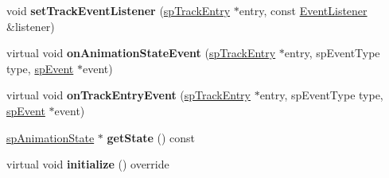 \begin{DoxyCompactItemize}
void {\bfseries set\+Track\+Event\+Listener} (\hyperlink{structspTrackEntry}{sp\+Track\+Entry} $\ast$entry, const \hyperlink{classEventListener}{Event\+Listener} \&listener)
\item 
\mbox{\label{classspine_1_1SkeletonAnimation_abb2d8c303332b7dbe0c5a7beef610cf4}} 
virtual void {\bfseries on\+Animation\+State\+Event} (\hyperlink{structspTrackEntry}{sp\+Track\+Entry} $\ast$entry, sp\+Event\+Type type, \hyperlink{structspEvent}{sp\+Event} $\ast$event)
\item 
\mbox{\label{classspine_1_1SkeletonAnimation_a53ccd986eb2d45482c5e851c2fbce9c4}} 
virtual void {\bfseries on\+Track\+Entry\+Event} (\hyperlink{structspTrackEntry}{sp\+Track\+Entry} $\ast$entry, sp\+Event\+Type type, \hyperlink{structspEvent}{sp\+Event} $\ast$event)
\item 
\mbox{\label{classspine_1_1SkeletonAnimation_a34133504a0541745b82c6097bae46b27}} 
\hyperlink{structspAnimationState}{sp\+Animation\+State} $\ast$ {\bfseries get\+State} () const
\item 
\mbox{\label{classspine_1_1SkeletonAnimation_a2f1e3c287dab545c33020a1a9b5ea089}} 
virtual void {\bfseries initialize} () override
\end{DoxyCompactItemize}
